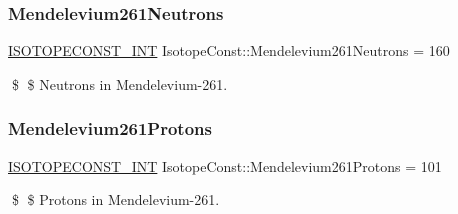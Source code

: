 \subsubsection{\texorpdfstring{Mendelevium261\+Neutrons}{Mendelevium261Neutrons}}
{\footnotesize\ttfamily \mbox{\hyperlink{group___isotope_const-_macros_ga5f18360b3e99483a35c32d789e62621c}{I\+S\+O\+T\+O\+P\+E\+C\+O\+N\+S\+T\+\_\+\+I\+NT}} Isotope\+Const\+::\+Mendelevium261\+Neutrons = 160}

\$ \$ Neutrons in Mendelevium-\/261. \mbox{\label{group___isotope_const-_mendelevium-_md261_gacb545baf97fc79ce0dea0418116997f8}} 
\subsubsection{\texorpdfstring{Mendelevium261\+Protons}{Mendelevium261Protons}}
{\footnotesize\ttfamily \mbox{\hyperlink{group___isotope_const-_macros_ga5f18360b3e99483a35c32d789e62621c}{I\+S\+O\+T\+O\+P\+E\+C\+O\+N\+S\+T\+\_\+\+I\+NT}} Isotope\+Const\+::\+Mendelevium261\+Protons = 101}

\$ \$ Protons in Mendelevium-\/261. 